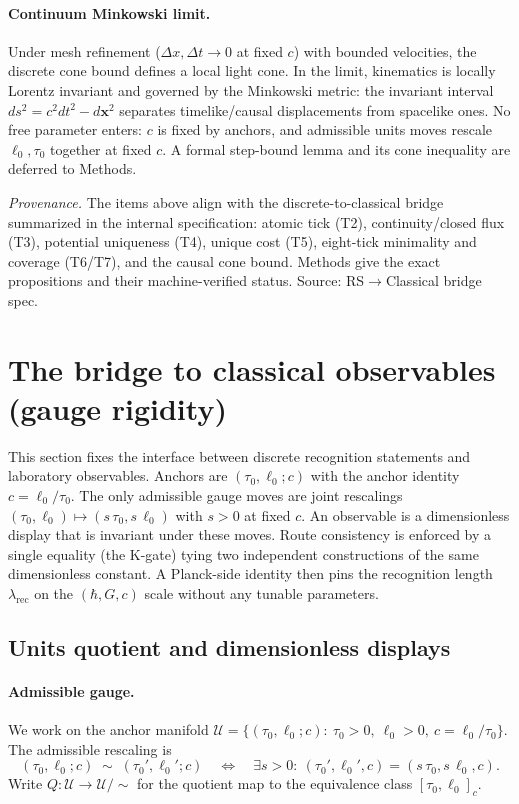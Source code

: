 \documentclass[11pt]{article}
\begin{document}
\paragraph{Continuum Minkowski limit.} Under mesh refinement ($\Delta x,\Delta t\to 0$ at fixed $c$) with bounded velocities, the discrete cone bound defines a local light cone. In the limit, kinematics is locally Lorentz invariant and governed by the Minkowski metric: the invariant interval $ds^2=c^2 dt^2 - d\mathbf{x}^2$ separates timelike/causal displacements from spacelike ones. No free parameter enters: $c$ is fixed by anchors, and admissible units moves rescale $\ell_0,\tau_0$ together at fixed $c$. A formal step-bound lemma and its cone inequality are deferred to Methods.

\bigskip
\noindent\emph{Provenance.} The items above align with the discrete-to-classical bridge summarized in the internal specification: atomic tick (T2), continuity/closed flux (T3), potential uniqueness (T4), unique cost (T5), eight-tick minimality and coverage (T6/T7), and the causal cone bound. Methods give the exact propositions and their machine-verified status. Source: RS$\to$Classical bridge spec. 

\section{The bridge to classical observables (gauge rigidity)}

This section fixes the interface between discrete recognition statements and laboratory observables. Anchors are $(\tau_0,\ell_0;c)$ with the anchor identity $c=\ell_0/\tau_0$. The only admissible gauge moves are joint rescalings $(\tau_0,\ell_0)\mapsto (s\,\tau_0, s\,\ell_0)$ with $s>0$ at fixed $c$. An observable is a dimensionless display that is invariant under these moves. Route consistency is enforced by a single equality (the K-gate) tying two independent constructions of the same dimensionless constant. A Planck-side identity then pins the recognition length $\lambda_{\mathrm{rec}}$ on the $(\hbar,G,c)$ scale without any tunable parameters.

\subsection{Units quotient and dimensionless displays}\label{subsec:units-quotient}

\paragraph{Admissible gauge.}
We work on the anchor manifold $\mathcal{U}=\{(\tau_0,\ell_0;c):\ \tau_0>0,\ \ell_0>0,\ c=\ell_0/\tau_0\}$. The admissible rescaling is
\[
(\tau_0,\ell_0;c)\;\sim\;(\tau_0',\ell_0';c)\quad\Longleftrightarrow\quad
\exists s>0:\ (\tau_0',\ell_0',c)=(s\,\tau_0, s\,\ell_0, c).
\]
Write $Q:\mathcal{U}\to \mathcal{U}/\!\sim$ for the quotient map to the equivalence class $[\tau_0,\ell_0]_c$.
\end{document}
